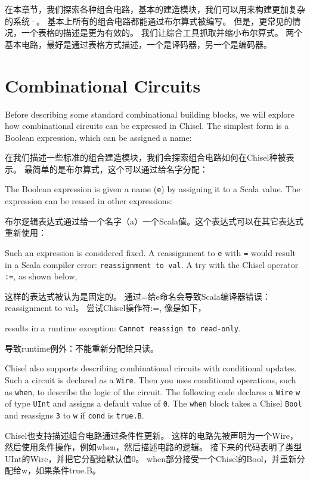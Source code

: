 \documentclass[%
    10pt,
    headinclude, footexclude,
    openright, %
    notitlepage,
    cleardoubleempty,
    headsepline,
    pointlessnumbers,
    bibtotoc, idxtotoc,
    ]{scrbook}
\newcommand{\code}[1]{{\small{\texttt{#1}}}}
\begin{document}
在本章节，我们探索各种组合电路，基本的建造模块，我们可以用来构建更加复杂的系统·。
基本上所有的组合电路都能通过布尔算式被编写。
但是，更常见的情况，一个表格的描述是更为有效的。
我们让综合工具抓取并缩小布尔算式。
两个基本电路，最好是通过表格方式描述，一个是译码器，另一个是编码器。

\section{Combinational Circuits}

Before describing some standard combinational building blocks, we will explore
how combinational circuits can be expressed in Chisel.
The simplest form is a Boolean expression, which can be assigned a name:

在我们描述一些标准的组合建造模块，我们会探索组合电路如何在Chisel种被表示。
最简单的是布尔算式，这个可以通过给名字分配：


\noindent The Boolean expression is given a name (\code{e}) by assigning it
to a Scala value. The expression can be reused in other expressions:

布尔逻辑表达式通过给一个名字（a）一个Scala值。这个表达式可以在其它表达式重新使用：


Such an expression is considered fixed. A reassignment to \code{e}
with \code{=} would result in a Scala compiler error: \code{reassignment to val}.
A try with the Chisel operator \code{:=}, as shown below,

这样的表达式被认为是固定的。
通过=给e命名会导致Scala编译器错误：reassignment to val。
尝试Chisel操作符:=, 像是如下，


\noindent results in a runtime exception: \code{Cannot reassign to read-only}.

导致runtime例外：不能重新分配给只读。

Chisel also supports describing combinational circuits with conditional updates.
Such a circuit is declared as a \code{Wire}. Then you uses conditional operations,
such as \code{when}, to describe the logic of the circuit.
The following code declares a \code{Wire} \code{w} of type \code{UInt} and assigns a default
value of \code{0}. The \code{when} block takes a Chisel \code{Bool} and reassigns
\code{3} to \code{w} if \code{cond} is \code{true.B}.

Chisel也支持描述组合电路通过条件性更新。
这样的电路先被声明为一个Wire，然后使用条件操作，例如when，然后描述电路的逻辑。
接下来的代码表明了类型UInt的Wire，并把它分配给默认值0。
when部分接受一个Chisel的Bool，并重新分配给w，如果条件true.B。
\end{document}
